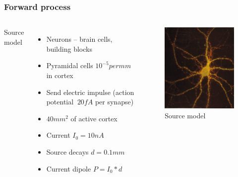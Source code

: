 \documentclass{beamer}
\begin{document}
\begin{frame}
    \frametitle{Forward process}
    \begin{columns}
        Source model
        \begin{itemize}
            \item Neurons – brain cells, building blocks
            \item Pyramidal cells $10^{-5} per mm$ in cortex
            \item Send electric impulse (action potential $~20fA$ per synapse)
            \item $40 mm^{2}$ of active cortex
            \item Current $I_{0} = 10 nA$
            \item Source  decays  $d = 0.1 mm$
            \item Current dipole $P = I_{0} * d$
        \end{itemize}

        \begin{figure}[H]
            \centering
            \includegraphics[height=0.5\textheight]{source_model.png}
            \caption{Source model}
            \label{fig:Source model}
        \end{figure}

    \end{columns}
\end{frame}
\end{document}
